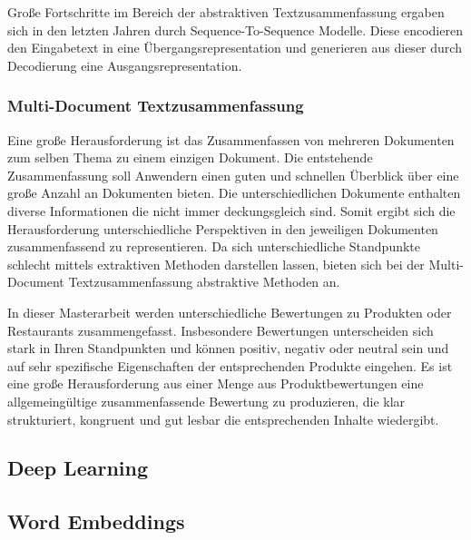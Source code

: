 Große Fortschritte im Bereich der abstraktiven Textzusammenfassung ergaben sich in den letzten Jahren durch Sequence-To-Sequence Modelle. Diese encodieren den Eingabetext in eine Übergangsrepresentation und generieren aus dieser durch Decodierung eine Ausgangsrepresentation.

\subsubsection{Multi-Document Textzusammenfassung}
Eine große Herausforderung ist das Zusammenfassen von mehreren Dokumenten zum selben Thema zu einem einzigen Dokument. 
Die entstehende Zusammenfassung soll Anwendern einen guten und schnellen Überblick über eine große Anzahl an Dokumenten bieten. 
Die unterschiedlichen Dokumente enthalten diverse Informationen die nicht immer deckungsgleich sind. 
Somit ergibt sich die Herausforderung unterschiedliche Perspektiven in den jeweiligen Dokumenten zusammenfassend zu representieren.
Da sich unterschiedliche Standpunkte schlecht mittels extraktiven Methoden darstellen lassen, bieten sich bei der Multi-Document Textzusammenfassung abstraktive Methoden an.

In dieser Masterarbeit werden unterschiedliche Bewertungen zu Produkten oder Restaurants zusammengefasst. Insbesondere Bewertungen unterscheiden sich stark in Ihren Standpunkten und können positiv, negativ oder neutral sein und auf sehr spezifische Eigenschaften der entsprechenden Produkte eingehen.
Es ist eine große Herausforderung aus einer Menge aus Produktbewertungen eine allgemeingültige zusammenfassende Bewertung zu produzieren, die klar strukturiert, kongruent und gut lesbar die entsprechenden Inhalte wiedergibt.

\subsection{Deep Learning}

\subsection{Word Embeddings}


\pagebreak
